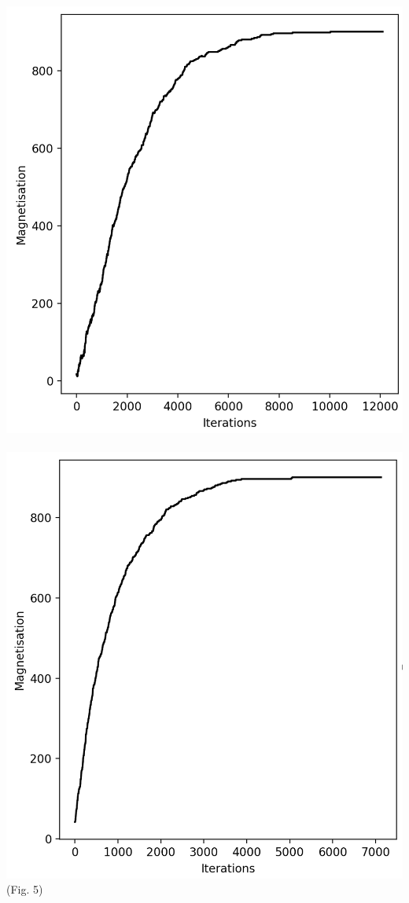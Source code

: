 \documentclass{article}
\begin{document}
\begin{center}
    \includegraphics[scale=.33]{lowMag.png}\ \includegraphics[scale=.33]{highMag.png}\\ 
    (Fig. 5)
\end{center}
\end{document}
